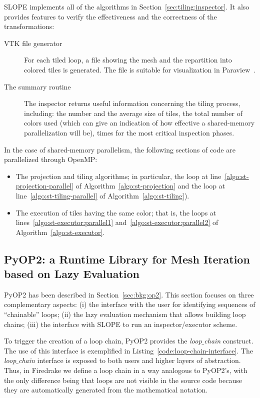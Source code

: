 SLOPE implements all of the algorithms in Section~\ref{sec:tiling:inspector}. It also provides features to verify the effectiveness and the correctness of the transformations:
\begin{description}
\item[VTK file generator] For each tiled loop, a file showing the mesh and the repartition into colored tiles is generated. The file is suitable for visualization in Paraview~\cite{paraview}.
\item[The summary routine] The inspector returns useful information concerning the tiling process, including: the number and the average size of tiles, the total number of colors used (which can give an indication of how effective a shared-memory parallelization will be), times for the most critical inspection phases. 
\end{description}

In the case of shared-memory parallelism, the following sections of code are parallelized through OpenMP:
\begin{itemize}
\item The projection and tiling algorithms; in particular, the loop at line~\ref{algo:st-projection-parallel} of Algorithm~\ref{algo:st-projection} and the loop at line~\ref{algo:st-tiling-parallel} of Algorithm~\ref{algo:st-tiling}).
\item The execution of tiles having the same color; that is, the loops at lines~\ref{algo:st-executor:parallel1} and~\ref{algo:st-executor:parallel2} of Algorithm~\ref{algo:st-executor}.
\end{itemize}


\subsection{PyOP2: a Runtime Library for Mesh Iteration based on Lazy Evaluation}
PyOP2 has been described in Section~\ref{sec:bkg:op2}. This section focuses on three complementary aspects: (i) the interface with the user for identifying sequences of ``chainable'' loops; (ii) the lazy evaluation mechanism that allows building loop chains; (iii) the interface with SLOPE to run an inspector/executor scheme.

To trigger the creation of a loop chain, PyOP2 provides the {\em loop$\_$chain} construct. The use of this interface is exemplified in Listing~\ref{code:loop-chain-interface}. The {\em loop$\_$chain} interface is exposed to both users and higher layers of abstraction. Thus, in Firedrake we define a loop chain in a way analogous to PyOP2's, with the only difference being that loops are not visible in the source code because they are automatically generated from the mathematical notation.

